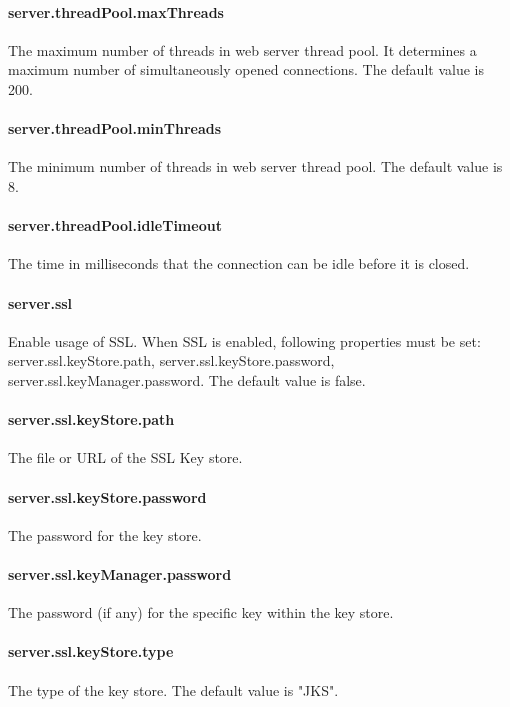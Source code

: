 \paragraph{server.threadPool.maxThreads}
The maximum number of threads in web server thread pool. It determines a maximum
number of simultaneously opened connections. The default value is 200.

\paragraph{server.threadPool.minThreads}
The minimum number of threads in web server thread pool. The default value is 8.

\paragraph{server.threadPool.idleTimeout}
The time in milliseconds that the connection can be idle before it is closed.

\paragraph{server.ssl}
Enable usage of SSL. When SSL is enabled, following properties must be set:
server.ssl.keyStore.path, server.ssl.keyStore.password, server.ssl.keyManager.password.
The default value is false.

\paragraph{server.ssl.keyStore.path}
The file or URL of the SSL Key store.
\paragraph{server.ssl.keyStore.password}
The password for the key store.
\paragraph{server.ssl.keyManager.password}
The password (if any) for the specific key within the key store.
\paragraph{server.ssl.keyStore.type}
The type of the key store. The default value is "JKS".

